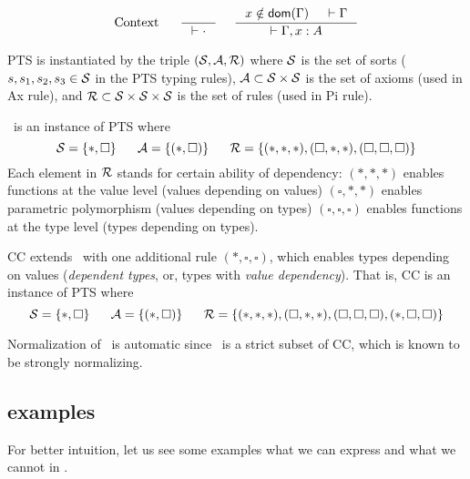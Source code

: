 \[\text{Context}~~~~~
 \inference{}{|-\cdot}
 ~~~~
 \inference{x\notin\dom(\Gamma) & |-\Gamma}{|-\Gamma,x:A}
\]

PTS is instantiated by the triple $(\mathcal{S},\mathcal{A},\mathcal{R})$ where
$\mathcal{S}$ is the set of sorts ($s,s_1,s_2,s_3\in\mathcal{S}$ in the PTS typing rules),
$\mathcal{A}\subset\mathcal{S}\times\mathcal{S}$ is the set of axioms (used in Ax rule), and
$\mathcal{R}\subset\mathcal{S}\times\mathcal{S}\times\mathcal{S}$ is the set of rules (used in Pi rule).

\Fw\ is an instance of PTS where
\[\mathcal{S}=\{*,\square\}
  ~~~~~
  \mathcal{A}=\{(*,\square)\}
  ~~~~~
  \mathcal{R}=\{(*,*,*),(\square,*,*),(\square,\square,\square)\}
\]
Each element in $\mathcal{R}$ stands for certain ability of dependency:
$(*,*,*)$ enables functions at the value level
(values depending on values)
$(\square,*,*)$ enables parametric polymorphism
(values depending on types)
$(\square,\square,\square)$ enables functions at the type level
(types depending on types).

CC extends \Fw\ with one additional rule
$(*,\square,\square)$, which enables types depending on values
(\emph{dependent types}, or, types with \emph{value dependency}).
That is, CC is an instance of PTS where
\[\mathcal{S}=\{*,\square\}
  ~~~~~
  \mathcal{A}=\{(*,\square)\}
  ~~~~~
  \mathcal{R}=\{(*,*,*),(\square,*,*),(\square,\square,\square)
         ,(*,\square,\square)\}\]


Normalization of \Fi\ is automatic since \Fi\ is a strict subset of CC,
which is known to be strongly normalizing.

\subsection{examples}
For better intuition, let us see some examples what we can express and
what we cannot in \Fi.
\newcommand{\List}{\mathsf{List}}
\newcommand{\Vect}{\mathsf{Vec}}

